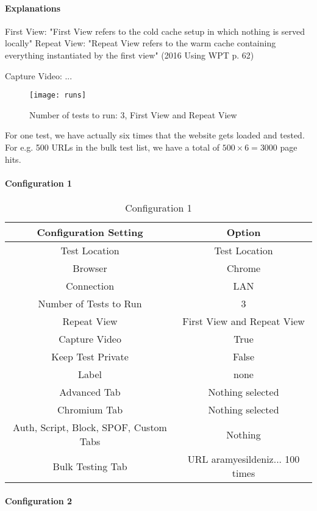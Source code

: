 \paragraph{Explanations}

First View: "First View refers to the cold cache setup in which nothing is served locally"
Repeat View: "Repeat View refers to the warm cache containing everything instantiated by the first view"
(2016 Using WPT p. 62)

Capture Video: ...

\begin{figure}[h!]
  \caption{Number of tests to run: 3, First View and Repeat View}
  \texttt{[image: runs]}
\end{figure}

For one test, we have actually six times that the website gets loaded and tested.
For e.g. 500 URLs in the bulk test list, we have a total of $500 \times 6 = 3000$ page hits.


\paragraph{Configuration 1}

\begin{table}[h]
	\caption[Test Runs]{Configuration 1}
	\label{tab:tamodelleVergleich}
	\centering
	\begin{tabular}{ |c|c| } 
	\hline
	Configuration Setting & Option \\
	\hline
	Test Location & Test Location \\ 
	Browser & Chrome \\
	\hline
	Connection & LAN \\
	Number of Tests to Run & 3 \\
	Repeat View & First View and Repeat View \\
	Capture Video & True \\
	Keep Test Private & False \\
	Label & none \\
	\hline	  
	Advanced Tab & Nothing selected \\
	Chromium Tab & Nothing selected  \\
	Auth, Script, Block, SPOF, Custom Tabs & Nothing  \\
	Bulk Testing Tab & URL aramyesildeniz... 100 times \\
	\hline
	\end{tabular}
\end{table}

\paragraph{Configuration 2}

